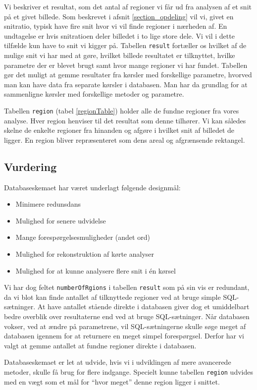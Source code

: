 {Vi beskriver et resultat, som det antal af regioner vi får ud fra
analysen af et snit på et givet billede. Som beskrevet i afsnit
\ref{section_opdeling} vil vi, givet en snitratio, typisk have fire snit
hvor vi vil finde regioner i nærheden af. En undtagelse er hvis
snitratioen deler billedet i to lige store dele. Vi vil i dette tilfælde
kun have to snit vi kigger på. Tabellen \texttt{result} fortæller os
hvilket af de mulige snit vi har med at gøre, hvilket billede resultatet
er tilknyttet, hvilke parametre der er blevet brugt samt hvor mange
regioner vi har fundet. Tabellen gør det muligt at gemme resultater fra
kørsler med forskellige parametre, hvorved man kan have data fra
separate kørsler i databasen. Man har da grundlag for at sammenligne
kørsler med forskellige metoder og parametre.

Tabellen \texttt{region} (tabel \ref{regionTable}) holder alle de fundne
regioner fra vores analyse. Hver region henviser til det resultat som
denne tilhører. Vi kan således skelne de enkelte regioner fra hinanden
og afgøre i hvilket snit af billedet de ligger. En region bliver
repræsenteret som dens areal og afgrænsende rektangel.

\subsection{Vurdering}
Databaseskemaet har været underlagt følgende designmål:

\begin{itemize}
    \item Minimere redunsdans
    \item Mulighed for senere udvidelse
    \item Mange forespørgelsesmuligheder (andet ord)
    \item Mulighed for rekonstruktion af kørte analyser
    \item Mulighed for at kunne analysere flere snit i én kørsel
\end{itemize}

Vi har dog feltet \texttt{numberOfRgions} i tabellen \texttt{result} som
på sin vis er redundant, da vi blot kan finde antallet af tilknyttede
regioner ved at bruge simple SQL-sætninger. At have antallet stående
direkte i databasen giver dog et umiddelbart bedre overblik over
resultaterne end ved at bruge SQL-sætninger. Når databasen vokser, ved
at ændre på parametrene, vil SQL-sætningerne skulle søge meget af
databasen igennem for at returnere en meget simpel forespørgsel. Derfor
har vi valgt at gemme antallet at fundne regioner direkte i databasen.

Databaseskemaet er let at udvide, hvis vi i udviklingen af mere
avancerede metoder, skulle få brug for flere indgange. Specielt kunne
tabellen \texttt{region} udvides med en vægt som et mål for ``hvor
meget'' denne region ligger i snittet.
}

